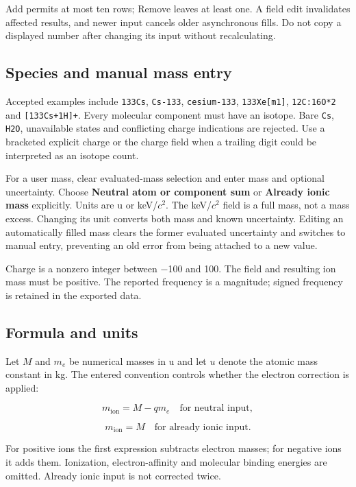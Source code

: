 \documentclass[
  aps,
  onecolumn,
  11pt]{revtex4-2}
\begin{document}
Add permits at most ten rows; Remove leaves at least one. A field edit
invalidates affected results, and newer input cancels older asynchronous
fills. Do not copy a displayed number after changing its input without
recalculating.

\subsection{Species and manual mass
entry}\label{species-and-manual-mass-entry}

Accepted examples include \texttt{133Cs}, \texttt{Cs-133},
\texttt{cesium-133}, \texttt{133Xe{[}m1{]}}, \texttt{12C:16O*2} and
\texttt{{[}133Cs+1H{]}+}. Every molecular component must have an
isotope. Bare \texttt{Cs}, \texttt{H2O}, unavailable states and
conflicting charge indications are rejected. Use a bracketed explicit
charge or the charge field when a trailing digit could be interpreted as
an isotope count.

For a user mass, clear evaluated-mass selection and enter mass and
optional uncertainty. Choose \textbf{Neutral atom or component sum} or
\textbf{Already ionic mass} explicitly. Units are u or keV/\(c^2\). The
keV/\(c^2\) field is a full mass, not a mass excess. Changing its unit
converts both mass and known uncertainty. Editing an automatically
filled mass clears the former evaluated uncertainty and switches to
manual entry, preventing an old error from being attached to a new
value.

Charge is a nonzero integer between −100 and 100. The field and
resulting ion mass must be positive. The reported frequency is a
magnitude; signed frequency is retained in the exported data.

\subsection{Formula and units}\label{formula-and-units}

Let \(M\) and \(m_e\) be numerical masses in u and let \(u\) denote the
atomic mass constant in kg. The entered convention controls whether the
electron correction is applied:

\[m_{\mathrm{ion}}=M-qm_e\quad\text{for neutral input},\]

\[m_{\mathrm{ion}}=M\quad\text{for already ionic input}.\]

For positive ions the first expression subtracts electron masses; for
negative ions it adds them. Ionization, electron-affinity and molecular
binding energies are omitted. Already ionic input is not corrected
twice.
\end{document}
